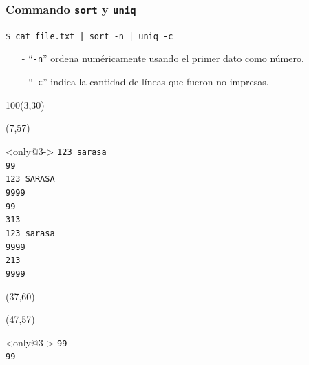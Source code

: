 \documentclass{beamer}
\begin{document}
\begin{frame}[fragile,t]
    \frametitle{Commando \texttt{sort} y \texttt{uniq}}
    \vspace{-0.5cm}
    \begin{block}{\vspace*{-3ex}}
    \texttt{\$}\verb: cat file.txt | sort -n | uniq -c:
    \vspace*{0.5ex}
    \end{block}
    \vspace{-0.2cm}
    \begin{itemize}
    \item[-] ``\verb|-n|'' ordena numéricamente usando el primer dato como número.
    \item[-] ``\verb|-c|'' indica la cantidad de líneas que fueron no impresas.
    \end{itemize}
    \begin{textblock}{100}(3,30)
    \begin{center}
    \end{center}
    \end{textblock}
    \begin{textblock}{35}(7,57)
    \begin{block}<only@3->{\vspace*{-3ex}}
    \scriptsize
    \verb:123 sarasa:\\
    \verb:99:\\
    \verb:123 SARASA:\\
    \verb:9999:\\
    \verb:99:\\
    \verb:313:\\
    \verb:123 sarasa:\\
    \verb:9999:\\
    \verb:213:\\
    \verb:9999:
    \vspace*{0.5ex}
    \end{block}
    \end{textblock}
    \begin{textblock}{35}(37,60)
    \end{textblock}
    \begin{textblock}{35}(47,57)
    \begin{block}<only@3->{\vspace*{-3ex}}
    \scriptsize
    \verb:99:\\
    \verb:99:\\

\end{block}
\end{textblock}
\end{frame}
\end{document}

